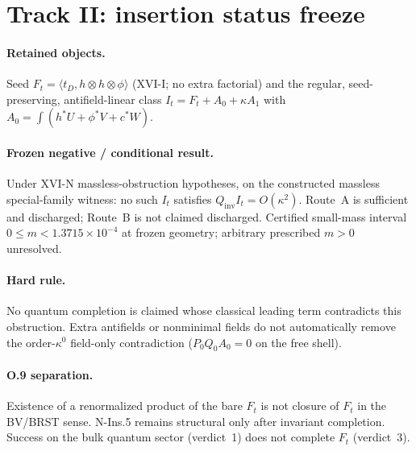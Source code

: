 \section{Track II: insertion status freeze}
\label{sec:O-ins-freeze}

\paragraph{Retained objects.}
Seed $F_t=\langle t_D,h\otimes h\otimes\phi\rangle$ (XVI-I; no extra factorial) and the
regular, seed-preserving, antifield-linear class
$I_t=F_t+A_0+\kappa A_1$ with $A_0=\int(h^*U+\phi^*V+c^*W)$.

\paragraph{Frozen negative / conditional result.}
Under XVI-N massless-obstruction hypotheses, on the constructed massless special-family
witness: no such $I_t$ satisfies $Q_{\mathrm{inv}}I_t=O(\kappa^2)$. Route~A is sufficient
and discharged; Route~B is not claimed discharged. Certified small-mass interval
$0\le m<1.3715\times10^{-4}$ at frozen geometry; arbitrary prescribed $m>0$ unresolved.

\paragraph{Hard rule.}
No quantum completion is claimed whose classical leading term contradicts this obstruction.
Extra antifields or nonminimal fields do not automatically remove the order-$\kappa^0$
field-only contradiction ($P_0 Q_0 A_0=0$ on the free shell).

\paragraph{O.9 separation.}
Existence of a renormalized product of the bare $F_t$ is not closure of $F_t$ in the
BV/BRST sense. N-Ins.5 remains structural only after invariant completion.
Success on the bulk quantum sector (verdict~1) does not complete $F_t$ (verdict~3).
